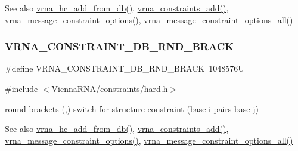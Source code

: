 \begin{DoxySeeAlso}{See also}
\mbox{\hyperlink{group__hard__constraints_ga5b4de3247b67358080c176b94591a8e6}{vrna\+\_\+hc\+\_\+add\+\_\+from\+\_\+db()}}, \mbox{\hyperlink{group__constraints_ga35a401f680969a556858a8dd5f1d07cc}{vrna\+\_\+constraints\+\_\+add()}}, \mbox{\hyperlink{group__constraints_gaa1f20b53bf09ac2e6b0dbb13f7d89670}{vrna\+\_\+message\+\_\+constraint\+\_\+options()}}, \mbox{\hyperlink{group__constraints_gaec7e13fa0465c2acc7a621d1aecb709f}{vrna\+\_\+message\+\_\+constraint\+\_\+options\+\_\+all()}} 
\end{DoxySeeAlso}
\mbox{\label{group__hard__constraints_gac17b034852c914bc5879954c65d7e74b}} 
\subsubsection{\texorpdfstring{VRNA\_CONSTRAINT\_DB\_RND\_BRACK}{VRNA\_CONSTRAINT\_DB\_RND\_BRACK}}
{\footnotesize\ttfamily \#define V\+R\+N\+A\+\_\+\+C\+O\+N\+S\+T\+R\+A\+I\+N\+T\+\_\+\+D\+B\+\_\+\+R\+N\+D\+\_\+\+B\+R\+A\+CK~1048576U}



{\ttfamily \#include $<$\mbox{\hyperlink{hard_8h}{Vienna\+R\+N\+A/constraints/hard.\+h}}$>$}



round brackets \textquotesingle{}(\textquotesingle{},\textquotesingle{})\textquotesingle{} switch for structure constraint (base i pairs base j) 

\begin{DoxySeeAlso}{See also}
\mbox{\hyperlink{group__hard__constraints_ga5b4de3247b67358080c176b94591a8e6}{vrna\+\_\+hc\+\_\+add\+\_\+from\+\_\+db()}}, \mbox{\hyperlink{group__constraints_ga35a401f680969a556858a8dd5f1d07cc}{vrna\+\_\+constraints\+\_\+add()}}, \mbox{\hyperlink{group__constraints_gaa1f20b53bf09ac2e6b0dbb13f7d89670}{vrna\+\_\+message\+\_\+constraint\+\_\+options()}}, \mbox{\hyperlink{group__constraints_gaec7e13fa0465c2acc7a621d1aecb709f}{vrna\+\_\+message\+\_\+constraint\+\_\+options\+\_\+all()}} 
\end{DoxySeeAlso}
\mbox{\label{group__hard__constraints_ga5c17253f5a39d1d49b0fb11f5196982a}} 
